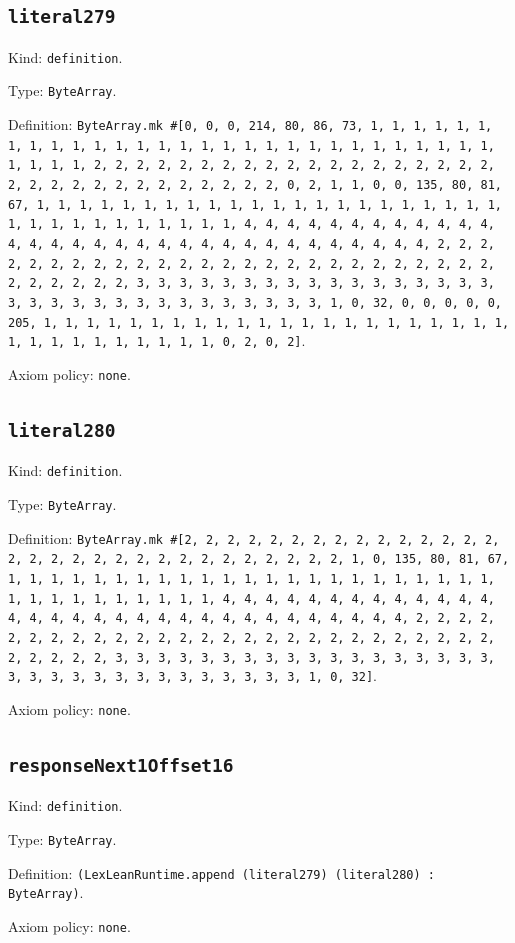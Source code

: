 \documentclass[11pt]{article}
\begin{document}
\subsection*{\texttt{literal279}}
\noindent Kind: \texttt{definition}.\par
\noindent Type: \texttt{ByteArray}.\par
\noindent Definition: \texttt{ByteArray.mk \#[0, 0, 0, 214, 80, 86, 73, 1, 1, 1, 1, 1, 1, 1, 1, 1, 1, 1, 1, 1, 1, 1, 1, 1, 1, 1, 1, 1, 1, 1, 1, 1, 1, 1, 1, 1, 1, 1, 1, 1, 2, 2, 2, 2, 2, 2, 2, 2, 2, 2, 2, 2, 2, 2, 2, 2, 2, 2, 2, 2, 2, 2, 2, 2, 2, 2, 2, 2, 2, 2, 2, 2, 0, 2, 1, 1, 0, 0, 135, 80, 81, 67, 1, 1, 1, 1, 1, 1, 1, 1, 1, 1, 1, 1, 1, 1, 1, 1, 1, 1, 1, 1, 1, 1, 1, 1, 1, 1, 1, 1, 1, 1, 1, 1, 1, 4, 4, 4, 4, 4, 4, 4, 4, 4, 4, 4, 4, 4, 4, 4, 4, 4, 4, 4, 4, 4, 4, 4, 4, 4, 4, 4, 4, 4, 4, 4, 4, 2, 2, 2, 2, 2, 2, 2, 2, 2, 2, 2, 2, 2, 2, 2, 2, 2, 2, 2, 2, 2, 2, 2, 2, 2, 2, 2, 2, 2, 2, 2, 2, 3, 3, 3, 3, 3, 3, 3, 3, 3, 3, 3, 3, 3, 3, 3, 3, 3, 3, 3, 3, 3, 3, 3, 3, 3, 3, 3, 3, 3, 3, 3, 3, 1, 0, 32, 0, 0, 0, 0, 0, 205, 1, 1, 1, 1, 1, 1, 1, 1, 1, 1, 1, 1, 1, 1, 1, 1, 1, 1, 1, 1, 1, 1, 1, 1, 1, 1, 1, 1, 1, 1, 1, 1, 0, 2, 0, 2]}.\par
\noindent Axiom policy: \texttt{none}.\par
\subsection*{\texttt{literal280}}
\noindent Kind: \texttt{definition}.\par
\noindent Type: \texttt{ByteArray}.\par
\noindent Definition: \texttt{ByteArray.mk \#[2, 2, 2, 2, 2, 2, 2, 2, 2, 2, 2, 2, 2, 2, 2, 2, 2, 2, 2, 2, 2, 2, 2, 2, 2, 2, 2, 2, 2, 2, 2, 1, 0, 135, 80, 81, 67, 1, 1, 1, 1, 1, 1, 1, 1, 1, 1, 1, 1, 1, 1, 1, 1, 1, 1, 1, 1, 1, 1, 1, 1, 1, 1, 1, 1, 1, 1, 1, 1, 1, 4, 4, 4, 4, 4, 4, 4, 4, 4, 4, 4, 4, 4, 4, 4, 4, 4, 4, 4, 4, 4, 4, 4, 4, 4, 4, 4, 4, 4, 4, 4, 4, 2, 2, 2, 2, 2, 2, 2, 2, 2, 2, 2, 2, 2, 2, 2, 2, 2, 2, 2, 2, 2, 2, 2, 2, 2, 2, 2, 2, 2, 2, 2, 2, 3, 3, 3, 3, 3, 3, 3, 3, 3, 3, 3, 3, 3, 3, 3, 3, 3, 3, 3, 3, 3, 3, 3, 3, 3, 3, 3, 3, 3, 3, 3, 3, 1, 0, 32]}.\par
\noindent Axiom policy: \texttt{none}.\par
\subsection*{\texttt{responseNext1Offset16}}
\noindent Kind: \texttt{definition}.\par
\noindent Type: \texttt{ByteArray}.\par
\noindent Definition: \texttt{(LexLeanRuntime.append (literal279) (literal280) : ByteArray)}.\par
\noindent Axiom policy: \texttt{none}.\par
\end{document}

